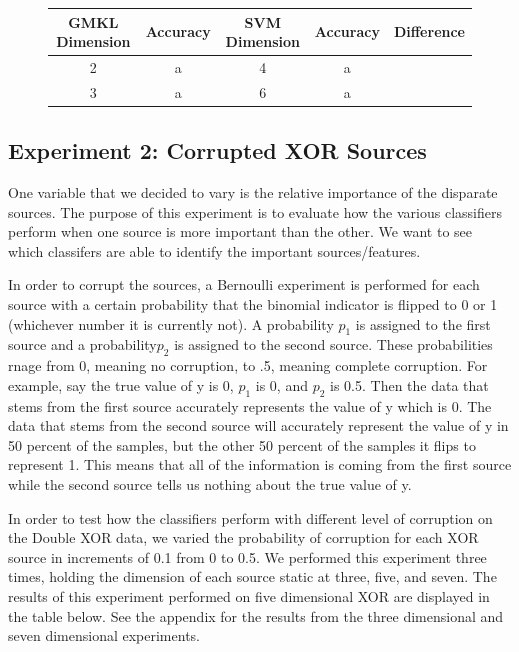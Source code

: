 \documentclass{article}
\begin{document}
\begin{figure}
\begin{center}
\begin{tabular}{|c| c| c| c| c| }
\hline
GMKL Dimension & Accuracy & SVM Dimension & Accuracy & Difference\\
\hline
2 & a & 4 & a\\
\hline
3 & a & 6 &a
\end{tabular}
\end{center}
\end{figure}









\subsection*{Experiment 2: Corrupted XOR Sources}

One variable that we decided to vary is the relative importance of the
disparate sources. The purpose of this experiment is to evaluate how the
various classifiers perform when one source is more important than the other.
We want to see which classifers are able to identify the important
sources/features.

In order to corrupt the sources, a Bernoulli experiment is performed for each
source with a certain probability that the binomial indicator is flipped to 0
or 1 (whichever number it is currently not). A probability $p_1$ is assigned to
the first source and a probability$ p_2$ is assigned to the second source.
These probabilities rnage from 0, meaning no corruption, to .5, meaning
complete corruption. For example, say the true value of y is 0, $p_1$ is 0, and
$p_2$ is 0.5. Then the data that stems from the first source accurately
represents the value of y which is 0. The data that stems from the second
source will accurately represent the value of y in 50 percent of the samples,
but the other 50 percent of the samples it flips to represent 1. This means
that all of the information is coming from the first source while the second
source tells us nothing about the true value of y.

In order to test how the classifiers perform with different level of corruption
on the Double XOR data, we varied the probability of corruption for each XOR
source in increments of 0.1 from 0 to 0.5. We performed this experiment three
times, holding the dimension of each source static at three, five, and seven.
The results of this experiment performed on five dimensional XOR are displayed
in the table below. See the appendix for the results from the three dimensional
and seven dimensional experiments.
\end{document}
